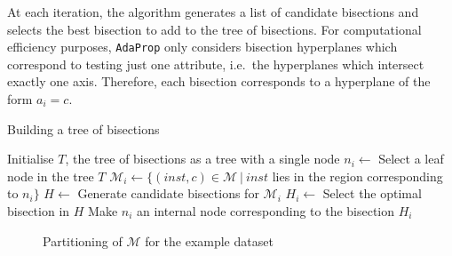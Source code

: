\documentclass[a4paper,12pt]{article} %
\newcommand{\AdaProp}{\texttt{AdaProp}\xspace}
\newcommand{\mcl}[1]{\mathcal{#1}}
\begin{document}
At each iteration,
    the algorithm generates a list of candidate bisections and
    selects the best bisection to add to the tree of bisections.
For computational efficiency purposes,
    \AdaProp only considers bisection hyperplanes which
    correspond to testing just one attribute, 
    i.e.\ the hyperplanes which intersect exactly one axis.
Therefore, each bisection corresponds to a hyperplane of the form $a_i = c$.

\begin{algorithm}
\caption{Building a tree of bisections}
\label{algoTree}
\begin{algorithmic}
\State Initialise $T$, the tree of bisections as a tree with a single node
\Loop 
    \State $n_i \gets$ Select a leaf node in the tree $T$
    \State $\mcl{M}_i \gets \{ (inst,c) \in \mcl{M} ~|~ inst$ 
        lies in the region corresponding to $n_i \}$
    \State $H \gets$ Generate candidate bisections for $\mcl{M}_i$
    \State $H_i \gets$ Select the optimal bisection in $H$
    \State Make $n_i$ an internal node corresponding 
        to the bisection $H_i$
\EndLoop
\end{algorithmic}
\end{algorithm}

\begin{figure}
\begin{center}
\end{center}
\caption{Partitioning of $\mcl{M}$ for the example dataset}
\label{visMpart}
\end{figure}
\end{document}
